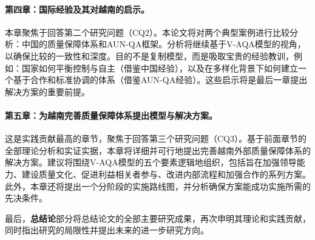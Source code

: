 \paragraph{第四章：国际经验及其对越南的启示。}
本章聚焦于回答第二个研究问题（CQ2）。本论文将对两个典型案例进行比较分析：中国的质量保障体系和AUN-QA框架。分析将继续基于V-AQA模型的视角，以确保比较的一致性和深度。目的不是复制模型，而是吸取宝贵的经验教训，例如：国家如何平衡控制与自主（借鉴中国经验），以及在多样化背景下如何建立一个基于合作和标准协调的体系（借鉴AUN-QA经验）。这些启示将是最后一章提出解决方案的重要前提。

\paragraph{第五章：为越南完善质量保障体系提出模型与解决方案。}
这是实践贡献最高的章节，聚焦于回答第三个研究问题（CQ3）。基于前面章节的全部理论分析和实证实据，本章将详细并可行地提出完善越南外部质量保障体系的解决方案。建议将围绕V-AQA模型的五个要素逻辑地组织，包括旨在加强领导能力、建设质量文化、促进利益相关者参与、改进内部流程和加强合作的系列方案。此外，本章还将提出一个分阶段的实施路线图，并分析确保方案能成功实施所需的先决条件。

最后，\textbf{总结论}部分将总结论文的全部主要研究成果，再次申明其理论和实践贡献，同时指出研究的局限性并提出未来的进一步研究方向。








